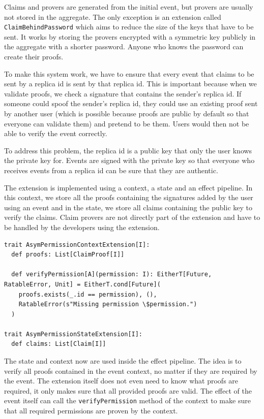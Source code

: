 \documentclass[
	english,
	ruledheaders=section,   %
	class=report,		    %
	thesis={type=bachelor}, %
	accentcolor=9c,			%
	custommargins=true,    %
	marginpar=false,        %
	parskip=half-,          %
	fontsize=11pt,          %
]{tudapub}
\begin{document}
Claims and provers are generated from the initial event, but provers are usually not stored in the aggregate. The only exception is an extension called \texttt{ClaimBehindPassword} which aims to reduce the size of the keys that have to be sent. It works by storing the provers encrypted with a symmetric key publicly in the aggregate with a shorter password. Anyone who knows the password can create their proofs.

To make this system work, we have to ensure that every event that claims to be sent by a replica id is sent by that replica id. This is important because when we validate proofs, we check a signature that contains the sender's replica id. If someone could spoof the sender's replica id, they could use an existing proof sent by another user (which is possible because proofs are public by default so that everyone can validate them) and pretend to be them. Users would then not be able to verify the event correctly.

To address this problem, the replica id is a public key that only the user knows the private key for. Events are signed with the private key so that everyone who receives events from a replica id can be sure that they are authentic.

The extension is implemented using a context, a state and an effect pipeline. In this context, we store all the proofs containing the signatures added by the user using an event and in the state, we store all claims containing the public key to verify the claims. Claim provers are not directly part of the extension and have to be handled by the developers using the extension.

\begin{lstlisting}
trait AsymPermissionContextExtension[I]:
  def proofs: List[ClaimProof[I]]

  def verifyPermission[A](permission: I): EitherT[Future, RatableError, Unit] = EitherT.cond[Future](
    proofs.exists(_.id == permission), (),
    RatableError(s"Missing permission \$permission.")
  )

trait AsymPermissionStateExtension[I]:
  def claims: List[Claim[I]]
\end{lstlisting}

The state and context now are used inside the effect pipeline. The idea is to verify all proofs contained in the event context, no matter if they are required by the event. The extension itself does not even need to know what proofs are required, it only makes sure that all provided proofs are valid. The effect of the event itself can call the \texttt{verifyPermission} method of the context to make sure that all required permissions are proven by the context.
\end{document}
